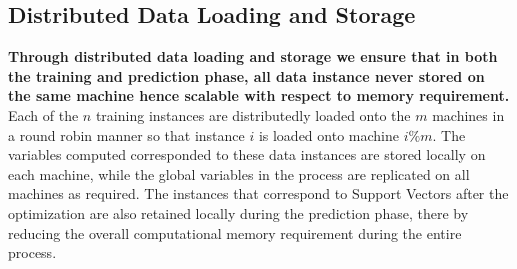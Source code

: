 \documentclass[12pt]{article}
\begin{document}
 \subsection{Distributed Data Loading and Storage}
 \label{Distributed Data Loading and Storage}
  {\bf Through distributed data loading and storage we ensure that in both the training and prediction phase, all data instance never stored on the same machine hence scalable with respect to memory requirement.}
  \newline\newline
 Each of the $n$ training instances are distributedly loaded onto the $m$ machines in a round robin manner so that instance $i$ is loaded onto machine $i\%m$. The variables computed corresponded to these data instances are stored locally on each machine, while the global variables in the process are replicated on all machines as required. The instances that correspond to Support Vectors after the optimization are also retained locally during the prediction phase, there by reducing the overall computational memory requirement during the entire process.
\end{document}
